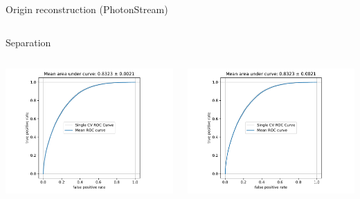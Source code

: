 \begin{frame}{Origin reconstruction (PhotonStream)}
\begin{columns}[onlytextwidth]
\begin{column}{0.475\textwidth}
    \end{column}
  \end{columns}
\end{frame}

\begin{frame}[t]{Separation}
\begin{columns}[onlytextwidth]
\begin{column}{0.475\textwidth}
  \centering
  \includegraphics[width=1.1\textwidth, page=1]{fig/separation_performance_DBSCAN.pdf}
\end{column}
\hfill%
\begin{column}{0.475\textwidth}
    \centering
    \includegraphics[width=\textwidth, page=2]{fig/separation_performance_DBSCAN.pdf}
\end{column}
\end{columns}
\end{frame}

